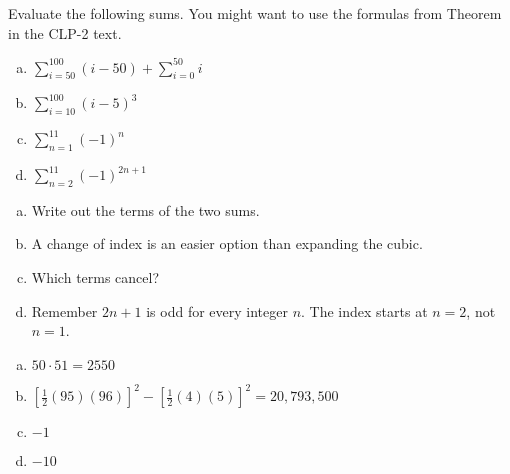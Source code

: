 \begin{question}\label{1.1sigmab}
Evaluate the following sums. You might want to use the formulas from Theorem~ in the CLP-2 text.
\begin{enumerate}[(a)]
\item $\displaystyle\sum_{i=50}^{100} (i-50)+\displaystyle\sum_{i=0}^{50} i$
\item $\displaystyle\sum_{i=10}^{100} \left(i-5\right)^3$
\item $\displaystyle\sum_{n=1}^{11} (-1)^n$
\item $\displaystyle\sum_{n=2}^{11} (-1)^{2n+1}$
\end{enumerate}
\end{question}
\begin{hint}
\begin{enumerate}[(a)]
\item Write out the terms of the two sums.
\item A change of index is an easier option than expanding the cubic.
\item Which terms cancel?
\item Remember $2n+1$ is odd for every integer $n$. The index starts at $n=2$, not $n=1$.
\end{enumerate}
\end{hint}
\begin{answer}
\begin{enumerate}[(a)]
\item $50\cdot 51=2550$
\item $\left[\frac{1}{2}(95)(96)\right]^2-\left[\frac{1}{2}(4)(5)\right]^2=20,793,500$
\item $-1$
\item $-10$
\end{enumerate}
\end{answer}
